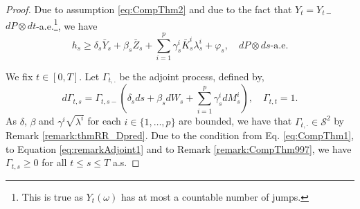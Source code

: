 \documentclass[11pt,a4paper]{article}
\numberwithin{equation}{section}
\theoremstyle{newPlain}
\theoremstyle{newDefinition}
\theoremstyle{newRemark}
\begin{document}
{\begin{proof}
Due to  assumption \eqref{eq:CompThm2} and due to the fact that $Y_t 
= Y_{t-}$ $dP\otimes dt$-a.e.\footnote{This is true as $Y_t(\omega)$ has at most a countable number of jumps.}, we have
\begin{equation}\label{eq:proofCompThm1}
    h_s\ge\delta_s\bar{Y}_s + \beta_s\bar{Z}_s + \sum_{i=1}^p\gamma_s^i\bar{K}_s^i\lambda_s^i + \varphi_s,\quad dP\otimes ds\text{-a.e.}
\end{equation}

We fix $t\in[0,T]$. Let $\Gamma_{t,.}$ be the adjoint process, defined by,
\begin{equation*}
    d\Gamma_{t,s} = \Gamma_{t,s-}\left(\delta_sds+\beta_sdW_s+\sum_{i=1}^p\gamma_s^idM_s^i\right),\quad\Gamma_{t,t}=1.
\end{equation*}
As $\delta$, $\beta$ and $\gamma^i\sqrt{\lambda^i}$ for each $i\in\{1,\ldots,p\}$ are bounded, we have that $\Gamma_{t,\cdot}\in\mathcal{S}^2$ by Remark \ref{remark:thmRR_Dpred}. Due to the condition from Eq. \eqref{eq:CompThm1}, to Equation \eqref{eq:remarkAdjoint1} and to Remark \ref{remark:CompThm997}, we have $\Gamma_{t,s}\ge0$  for all $t\le s\le T$ a.s.  


\end{proof}}
\end{document}
